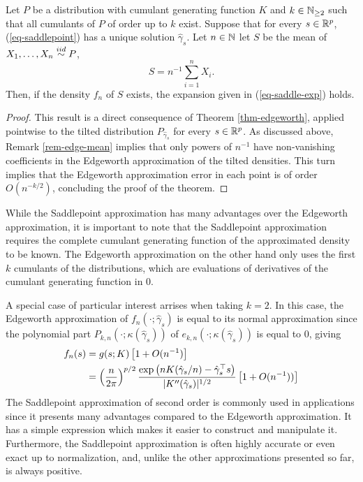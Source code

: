 \begin{theorem}
    Let $P$ be a distribution with cumulant generating function $K$ and $k \in \mathbb{N}_{\geq 2}$ such that all cumulants of $P$ of order up to $k$ exist. Suppose that for every $s \in {\mathbb{R}^p}$, (\ref{eq-saddlepoint}) has a unique solution $\hat\gamma_s$. Let $n \in \mathbb{N}$ let $S$ be the mean of $X_1, \ldots, X_n \stackrel{iid}{\sim} P$,
    \begin{equation*}
        S = n^{-1} \sum_{i=1}^n X_i.
    \end{equation*}
    Then, if the density $f_n$ of $S$ exists, the expansion given in (\ref{eq-saddle-exp}) holds.
\end{theorem}
\begin{proof}
    This result is a direct consequence of Theorem \ref{thm-edgeworth}, applied pointwise to the tilted distribution $P_{\hat\gamma_s}$ for every $s \in {\mathbb{R}^p}$. As discussed above, Remark \ref{rem-edge-mean} implies that only powers of $n^{-1}$ have non-vanishing coefficients in the Edgeworth approximation of the tilted densities. This turn implies that the Edgeworth approximation error in each point is of order $O(n^{-k/2})$, concluding the proof of the theorem.
\end{proof}

While the Saddlepoint approximation has many advantages over the Edgeworth approximation, it is important to note that the Saddlepoint approximation requires the complete cumulant generating function of the approximated density to be known. The Edgeworth approximation on the other hand only uses the first $k$ cumulants of the distributions, which are evaluations of derivatives of the cumulant generating function in 0. 

A special case of particular interest arrises when taking $k = 2$. In this case, the Edgeworth approximation of $f_n(\cdot; \hat\gamma_s)$ is equal to its normal approximation since the polynomial part $P_{k, n}(\cdot; \kappa(\hat\gamma_s))$ of $e_{k,n}(\cdot; \kappa(\hat\gamma_s))$ is equal to 0, giving
\begin{align} \label{eq-saddle-3}
    f_n(s) &= g(s; K)\left[1 + O(n^{-1})\right]\nonumber\\
    &= \left(\frac{n}{2\pi}\right)^{p/2} \frac{\exp\left(nK(\hat\gamma_s / n) - \hat\gamma_s^\top s\right)}{|K''(\hat\gamma_s)|^{1/2}} \left[1 + O(n^{-1}))\right]
\end{align}
The Saddlepoint approximation of second order is commonly used in applications since it presents many advantages compared to the Edgeworth approximation. It has a simple expression which makes it easier to construct and manipulate it. Furthermore, the Saddlepoint approximation is often highly accurate or even exact up to normalization, and, unlike the other approximations presented so far, is always positive.

